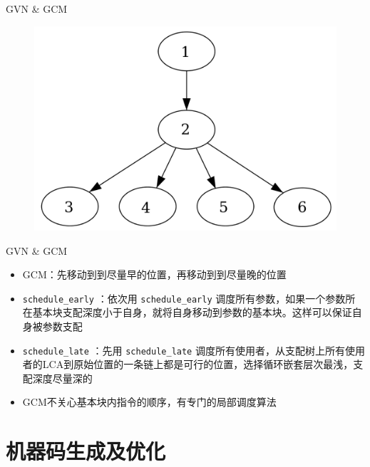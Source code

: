 \documentclass{beamer}
\begin{document}
\begin{frame}{GVN \& GCM}
\begin{minipage}{0.37\linewidth}
\begin{figure}[htpb]
    \includegraphics[width=1.0\linewidth]{pic/dom_tree.png}
  \end{figure}
\end{minipage}
\end{frame}

\begin{frame}{GVN \& GCM}
\begin{itemize}
\item GCM：先移动到到尽量早的位置，再移动到到尽量晚的位置
\item \lstinline|schedule_early| ：依次用 \lstinline|schedule_early| 调度所有参数，如果一个参数所在基本块支配深度小于自身，就将自身移动到参数的基本块。这样可以保证自身被参数支配
\item \lstinline|schedule_late| ：先用 \lstinline|schedule_late| 调度所有使用者，从支配树上所有使用者的LCA到原始位置的一条链上都是可行的位置，选择循环嵌套层次最浅，支配深度尽量深的
\item GCM不关心基本块内指令的顺序，有专门的局部调度算法
\end{itemize}

\end{frame}
\section{机器码生成及优化}
\end{document}
